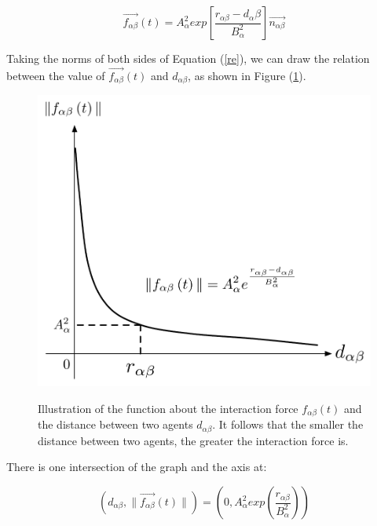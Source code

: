 \begin{equation}\label{re}
\overrightarrow{f_{\alpha\beta}}(t) = A_{\alpha}^{2} exp\left[ \frac{r_{\alpha\beta} - d_{\alpha}\beta}{B_{\alpha}^{2}}\right]  \overrightarrow{n_{\alpha\beta}}
\end{equation}

Taking the norms of both sides of Equation (\ref{re}), we can draw the relation between the value of $\overrightarrow{f_{\alpha\beta}}(t)$ and $ d_{\alpha\beta} $, as shown in Figure 
(\ref{physicalinteraction}).\\

\begin{figure}
    \centering
    {\includegraphics[scale=0.45]{Figures/physicalinteraction.pdf}} 
    \caption[Psysical interaction]{Illustration of the function about the interaction force 
        $f_{\alpha\beta}(t)$ and the distance between two agents
        $d_{\alpha \beta}$. It follows that the smaller the distance between two agents, the greater the interaction force is. }
    \label{physicalinteraction}
\end{figure}

There is one intersection of the graph and the  axis at:

\begin{equation}
	\left( d_{\alpha \beta} , \| \vec{f_{\alpha \beta}} \left( t \right) \| \right)
 =
	\left( 0 , A_{\alpha}^{2} exp\left( \frac{r_{\alpha\beta} }{B_{\alpha}^{2}}\right)  \right) 
\end{equation}

